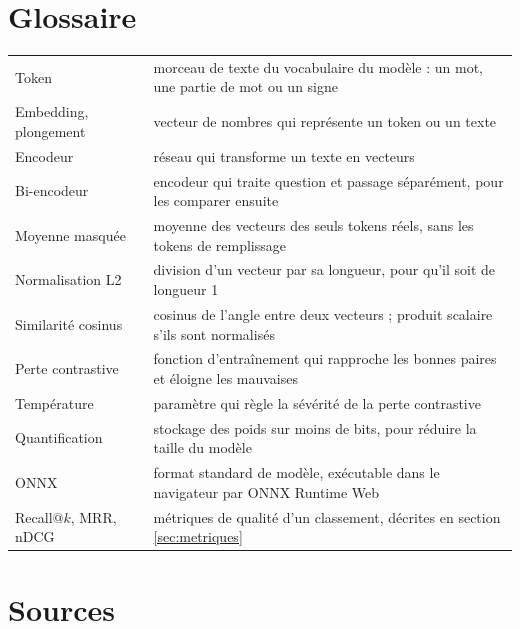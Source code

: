 \section{Glossaire}

\begin{tabletype}
\begin{tabularx}{\textwidth}{@{}L{3.6cm}Y@{}}
\toprule
{} &  \\
\midrule
Token & morceau de texte du vocabulaire du modèle : un mot, une partie de mot ou un signe \\
Embedding, plongement & vecteur de nombres qui représente un token ou un texte \\
Encodeur & réseau qui transforme un texte en vecteurs \\
Bi-encodeur & encodeur qui traite question et passage séparément, pour les comparer ensuite \\
Moyenne masquée & moyenne des vecteurs des seuls tokens réels, sans les tokens de remplissage \\
Normalisation L2 & division d'un vecteur par sa longueur, pour qu'il soit de longueur 1 \\
Similarité cosinus & cosinus de l'angle entre deux vecteurs ; produit scalaire s'ils sont normalisés \\
Perte contrastive & fonction d'entraînement qui rapproche les bonnes paires et éloigne les mauvaises \\
Température & paramètre qui règle la sévérité de la perte contrastive \\
Quantification & stockage des poids sur moins de bits, pour réduire la taille du modèle \\
ONNX & format standard de modèle, exécutable dans le navigateur par ONNX Runtime Web \\
Recall@$k$, MRR, nDCG & métriques de qualité d'un classement, décrites en section \ref{sec:metriques} \\
\bottomrule
\end{tabularx}
\end{tabletype}

\section{Sources}

